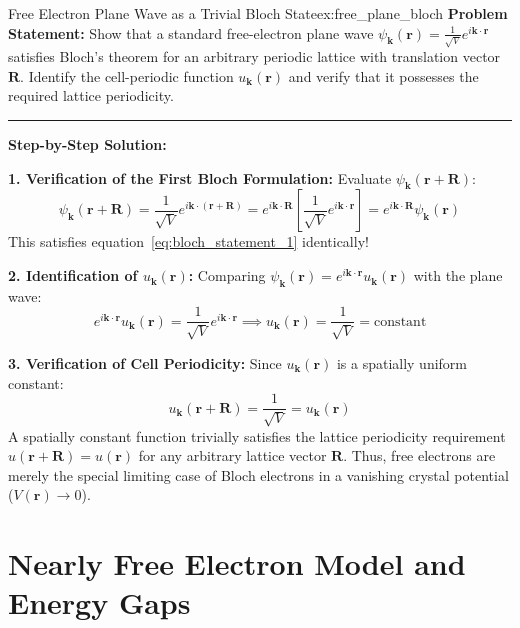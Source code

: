 \documentclass[11pt,a4paper]{article}
\newcommand{\vb}[1]{\mathbf{#1}}
\begin{document}
\begin{examplebox}{Free Electron Plane Wave as a Trivial Bloch State}{ex:free_plane_bloch}
\textbf{Problem Statement:}
Show that a standard free-electron plane wave $\psi_{\vb{k}}(\vb{r}) = \frac{1}{\sqrt{V}}e^{i\vb{k}\cdot\vb{r}}$ satisfies Bloch's theorem for an arbitrary periodic lattice with translation vector $\vb{R}$. Identify the cell-periodic function $u_{\vb{k}}(\vb{r})$ and verify that it possesses the required lattice periodicity.

\vspace{0.2cm}\hrule\vspace{0.2cm}
\textbf{Step-by-Step Solution:}

\textbf{1. Verification of the First Bloch Formulation:}
Evaluate $\psi_{\vb{k}}(\vb{r} + \vb{R})$:
\[
\psi_{\vb{k}}(\vb{r} + \vb{R}) = \frac{1}{\sqrt{V}}e^{i\vb{k}\cdot(\vb{r}+\vb{R})} = e^{i\vb{k}\cdot\vb{R}}\left[ \frac{1}{\sqrt{V}}e^{i\vb{k}\cdot\vb{r}} \right] = e^{i\vb{k}\cdot\vb{R}}\psi_{\vb{k}}(\vb{r})
\]
This satisfies equation~\eqref{eq:bloch_statement_1} identically!

\textbf{2. Identification of $u_{\vb{k}}(\vb{r})$:}
Comparing $\psi_{\vb{k}}(\vb{r}) = e^{i\vb{k}\cdot\vb{r}}u_{\vb{k}}(\vb{r})$ with the plane wave:
\[
e^{i\vb{k}\cdot\vb{r}}u_{\vb{k}}(\vb{r}) = \frac{1}{\sqrt{V}}e^{i\vb{k}\cdot\vb{r}} \implies u_{\vb{k}}(\vb{r}) = \frac{1}{\sqrt{V}} = \mathrm{constant}
\]

\textbf{3. Verification of Cell Periodicity:}
Since $u_{\vb{k}}(\vb{r})$ is a spatially uniform constant:
\[
u_{\vb{k}}(\vb{r} + \vb{R}) = \frac{1}{\sqrt{V}} = u_{\vb{k}}(\vb{r})
\]
A spatially constant function trivially satisfies the lattice periodicity requirement $u(\vb{r}+\vb{R}) = u(\vb{r})$ for any arbitrary lattice vector $\vb{R}$. Thus, free electrons are merely the special limiting case of Bloch electrons in a vanishing crystal potential ($V(\vb{r}) \to 0$).
\end{examplebox}

\clearpage


\section{Nearly Free Electron Model and Energy Gaps}
\label{sec:nearly_free_electron}
\end{document}
